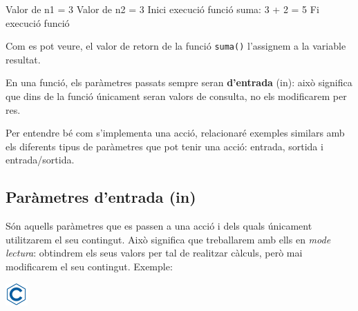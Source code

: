 \documentclass[]{book}
\newenvironment{Shaded}{\begin{snugshade}}{\end{snugshade}}
\newcommand{\DecValTok}[1]{\textcolor[rgb]{0.00,0.00,0.81}{#1}}
\newcommand{\NormalTok}[1]{#1}
\begin{document}
\begin{Shaded}
\begin{Highlighting}[]
\NormalTok{Valor de n1 = }\DecValTok{3}
\NormalTok{Valor de n2 = }\DecValTok{3}
\NormalTok{Inici execució funció}
\NormalTok{suma: }\DecValTok{3}\NormalTok{ + }\DecValTok{2}\NormalTok{ = }\DecValTok{5}
\NormalTok{Fi execució funció}
\end{Highlighting}
\end{Shaded}

Com es pot veure, el valor de retorn de la funció \texttt{suma()}
l'assignem a la variable resultat.

En una funció, els paràmetres passats sempre seran \textbf{d'entrada}
(in): això significa que dins de la funció únicament seran valors de
consulta, no els modificarem per res.

Per entendre bé com s'implementa una acció, relacionaré exemples
similars amb els diferents tipus de paràmetres que pot tenir una acció:
entrada, sortida i entrada/sortida.

\subsection{Paràmetres d'entrada (in)}\label{parametres-dentrada-in}

Són aquells paràmetres que es passen a una acció i dels quals únicament
utilitzarem el seu contingut. Això significa que treballarem amb ells en
\emph{mode lectura}: obtindrem els seus valors per tal de realitzar
càlculs, però mai modificarem el seu contingut. Exemple:

\includegraphics{./img/c.png}
\end{document}
